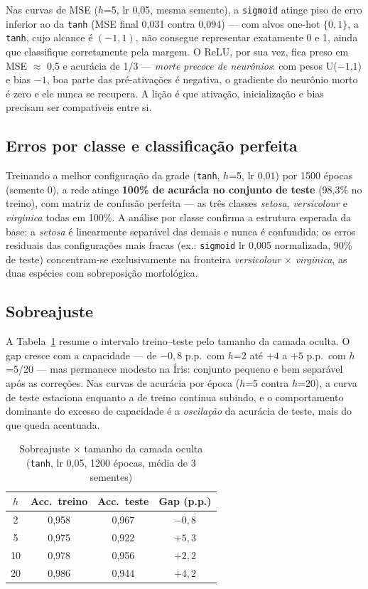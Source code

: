 \documentclass[conference]{IEEEtran}
\begin{document}
Nas curvas de MSE ($h$=5, lr 0,05, mesma semente), a \texttt{sigmoid} atinge piso de erro inferior ao da \texttt{tanh} (MSE final 0,031 contra 0,094) --- com alvos one-hot $\{0,1\}$, a \texttt{tanh}, cujo alcance é $(-1,1)$, não consegue representar exatamente 0 e 1, ainda que classifique corretamente pela margem. O ReLU, por sua vez, fica preso em MSE $\approx$ 0,5 e acurácia de 1/3 --- \emph{morte precoce de neurônios}: com pesos U($-1$,$1$) e bias $-1$, boa parte das pré-ativações é negativa, o gradiente do neurônio morto é zero e ele nunca se recupera. A lição é que ativação, inicialização e bias precisam ser compatíveis entre si.

\subsection{Erros por classe e classificação perfeita}

Treinando a melhor configuração da grade (\texttt{tanh}, $h$=5, lr 0,01) por 1500 épocas (semente 0), a rede atinge \textbf{100\% de acurácia no conjunto de teste} (98,3\% no treino), com matriz de confusão perfeita --- as três classes \textit{setosa}, \textit{versicolour} e \textit{virginica} todas em 100\%. A análise por classe confirma a estrutura esperada da base: a \textit{setosa} é linearmente separável das demais e nunca é confundida; os erros residuais das configurações mais fracas (ex.: \texttt{sigmoid} lr 0,005 normalizada, 90\% de teste) concentram-se exclusivamente na fronteira \textit{versicolour} $\times$ \textit{virginica}, as duas espécies com sobreposição morfológica.

\subsection{Sobreajuste}

A Tabela~\ref{tab:overfit} resume o intervalo treino--teste pelo tamanho da camada oculta. O gap cresce com a capacidade --- de $-0{,}8$ p.p.\ com $h$=2 até $+4$ a $+5$ p.p.\ com $h$=5/20 --- mas permanece modesto na Íris: conjunto pequeno e bem separável após as correções. Nas curvas de acurácia por época ($h$=5 contra $h$=20), a curva de teste estaciona enquanto a de treino continua subindo, e o comportamento dominante do excesso de capacidade é a \emph{oscilação} da acurácia de teste, mais do que queda acentuada.

\begin{table}[!t]
\caption{Sobreajuste $\times$ tamanho da camada oculta (\texttt{tanh}, lr 0,05, 1200 épocas, média de 3 sementes)}
\label{tab:overfit}
\centering
\begin{tabular}{cccc}
\hline
$h$ & Acc.\ treino & Acc.\ teste & Gap (p.p.) \\
\hline
2  & 0,958 & 0,967 & $-0{,}8$ \\
5  & 0,975 & 0,922 & $+5{,}3$ \\
10 & 0,978 & 0,956 & $+2{,}2$ \\
20 & 0,986 & 0,944 & $+4{,}2$ \\
\hline
\end{tabular}
\end{table}
\end{document}
